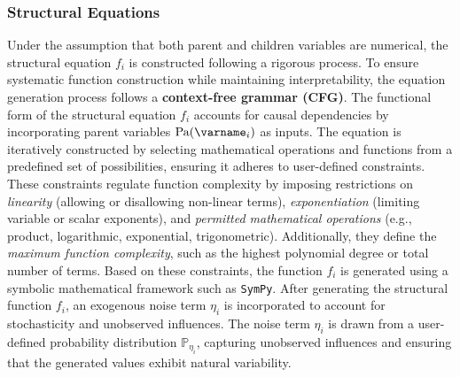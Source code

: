 \documentclass{uai2024} %
\begin{document}
        \subsubsection{Structural Equations}
            Under the assumption that both parent and children variables are numerical, the structural equation $ f_i $ is constructed following a rigorous process.
            To ensure systematic function construction while maintaining interpretability, the equation generation process follows a \textbf{context-free grammar (CFG)}. 
            The functional form of the structural equation $ f_i $ accounts for causal dependencies by incorporating parent variables $ \text{Pa}(\varname_i) $ as inputs. 
            The equation is iteratively constructed by selecting mathematical operations and functions from a predefined set of possibilities, ensuring it adheres to user-defined constraints. 
            These constraints regulate function complexity by imposing restrictions on \emph{linearity} (allowing or disallowing non-linear terms), \emph{exponentiation} (limiting variable or scalar exponents), and \emph{permitted mathematical operations} (e.g., product, logarithmic, exponential, trigonometric). Additionally, they define the \emph{maximum function complexity}, such as the highest polynomial degree or total number of terms.
            Based on these constraints, the function $ f_i $ is generated using a symbolic mathematical framework such as \texttt{SymPy}. 
            After generating the structural function \( f_i \), an exogenous noise term \( \eta_i \) is incorporated to account for stochasticity and unobserved influences. 
            The noise term  $ \eta_i $ is drawn from a user-defined probability distribution $ \mathbb{P}_{\eta_i} $, capturing unobserved influences and ensuring that the generated values exhibit natural variability.

        
\end{document}
